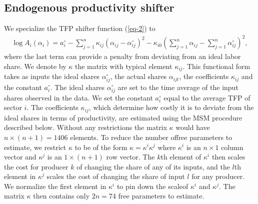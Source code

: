 \documentclass[11pt]{article}
\theoremstyle{definition}
\begin{document}
	\subsection*{Endogenous productivity shifter}
	We specialize the TFP shifter function (\ref{eq-2}) to
	\setcounter{equation}{68}
	\begin{align}
		\log A_i(\alpha_i) = a_i^{\circ} - \sum\limits_{j=1}^n \kappa_{ij}(\alpha_{ij}-\alpha_{ij}^{\circ})^2 - \kappa_{i0}\left(\sum\limits_{j=1}^n \alpha_{ij} - \sum\limits_{j=1}^n \alpha_{ij}^{\circ}\right)^2 ,\label{eq1-41}
	\end{align}
	where the last term can provide a penalty from deviating from an ideal labor share. We denote by $\kappa$ the matrix with typical element $\kappa_{ij}$. This functional form takes as inputs the ideal shares $\alpha_{ij}^{\circ}$, the actual shares $\alpha_{ijt}$, the coefficients $\kappa_{ij}$ and the constant $a_i^{\circ}$. The ideal shares $\alpha_{ij}^{\circ}$ are set to the time average of the input shares observed in the data. We set the constant $a_i^{\circ}$ equal to the average TFP of sector $i$. The coefficients $\kappa_{ij}$, which determine how costly it is to deviate from the ideal shares in terms of productivity, are estimated using the MSM procedure described below. Without any restrictions the matrix $\kappa$ would have $n \times (n + 1) = 1406$ elements. To reduce the number offree parameters to estimate, we restrict $\kappa$ to be of the form $\kappa = \kappa^i\kappa^j$ where $\kappa^i$ is an $n \times 1$ column vector and $\kappa^j$ is an $1 \times (n + 1)$ row vector. The $k$th element of $\kappa^i$ then scales the cost for producer $k$ of changing the share of any of its inputs, and the $l$th element in $\kappa^j$ scales the cost of changing the share of input $l$ for any producer. We normalize the first element in $\kappa^i$ to pin down the scaleof $\kappa^i$ and $\kappa^j$. The matrix $\kappa$ then contains only $2n = 74$ free parameters to estimate.
	
\end{document}

